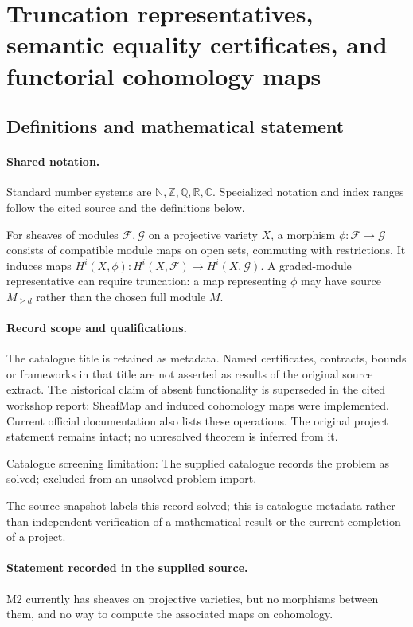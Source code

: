 \documentclass[11pt]{article}
\begin{document}
\section{Truncation representatives, semantic equality certificates, and functorial cohomology maps}\label{statement}

\subsection{Definitions and mathematical statement}

\paragraph{Shared notation.}Standard number systems are $\mathbb N,\mathbb Z,\mathbb Q,\mathbb R,\mathbb C$. Specialized notation and index ranges follow the cited source and the definitions below.


For sheaves of modules $\mathcal F,\mathcal G$ on a projective variety $X$, a morphism $\phi:\mathcal F\to\mathcal G$ consists of compatible module maps on open sets, commuting with restrictions. It induces maps $H^i(X,\phi):H^i(X,\mathcal F)\to H^i(X,\mathcal G)$. A graded-module representative can require truncation: a map representing $\phi$ may have source $M_{\geq d}$ rather than the chosen full module $M$.
\paragraph{Record scope and qualifications.}
The catalogue title is retained as metadata. Named certificates, contracts, bounds or frameworks in that title are not asserted as results of the original source extract.
The historical claim of absent functionality is superseded in the cited workshop report: SheafMap and induced cohomology maps were implemented. Current official documentation also lists these operations. The original project statement remains intact; no unresolved theorem is inferred from it.

Catalogue screening limitation: The supplied catalogue records the problem as solved; excluded from an unsolved-problem import.

The source snapshot labels this record solved; this is catalogue metadata rather than independent verification of a mathematical result or the current completion of a project.
\paragraph{Statement recorded in the supplied source.}
M2 currently has sheaves on projective varieties, but no morphisms between them, and no way to compute the associated maps on cohomology.
\end{document}
